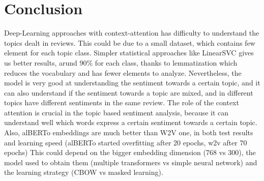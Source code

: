\documentclass{article}
\begin{document}
    \section{Conclusion}\label{sec:s6}
        Deep-Learning approaches with context-attention has difficulty to understand the topics dealt in reviews.
        This could be due to a small dataset, which contains few element for each topic class.
        Simpler statistical approaches like LinearSVC gives us better results, arund 90\% for each class, thanks to lemmatization which reduces the vocabulary and has fewer elements to analyze.
        Nevertheless, the model is very good at understanding the sentiment towards a certain topic, and it can also understand if the sentiment towards a topic are mixed, and in different topics have different sentiments in the same review.
        The role of the context attention is crucial in the topic based sentiment analysis, because it can understand well which words express a certain sentiment towards a certain topic.
        Also, alBERTo embeddings are much better than W2V one, in both test results and learning speed (alBERTo started overfitting after 20 epochs, w2v after 70 epochs)
        This could depend on the bigger embedding dimension (768 vs 300), the model used to obtain them (multiple transformers vs simple neural network) and the learning strategy (CBOW vs masked learning).
\end{document}
